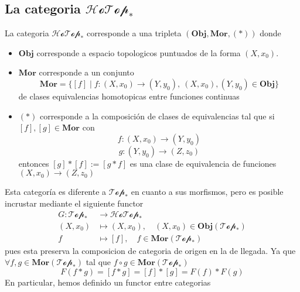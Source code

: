 \subsection{La categoria \(\mathscr{HoTop}_*\)}
\begin{definicion}
  La categoria \(\mathscr{HoTop}_*\) corresponde a una tripleta
  \((\mathbf{Obj},\mathbf {Mor}, (*))\) donde
  \begin{itemize}
  \item \(\mathbf {Obj}\) corresponde a espacio topologicos puntuados de la
    forma \((X, x_0)\).
  \item \(\mathbf {Mor}\) corresponde a un conjunto
    \[ \mathbf{Mor} = \{ [f] \mid f : (X,x_0) \to (Y,y_0),\
      (X,x_0),(Y,y_0) \in \mathbf {Obj} \}\]
    de clases equivalencias homotopicas entre funciones continuas
  \item \((*)\) corresponde a la composición de clases de
    equivalencias tal que si \([f] , [g] \in \mathbf {Mor} \) con
    \[ f : (X,x_0) \to (Y, y_0)\]
    \[ g : (Y, y_0) \to (Z, z_0)\]
    entonces \([g] * [f] := [ g * f ] \) es una clase de equivalencia de
    funciones \((X, x_0) \to (Z, z_0)\)
  \end{itemize}
\end{definicion}
Esta categoría es diferente a \(\mathscr{Top}_*\) en cuanto a sus
morfismos, pero es posible incrustar mediante el siguiente functor
\begin{align*}
  G : \mathscr{Top}_* &\longrightarrow \mathscr{HoTop}_* \\
      \left( X , x_0 \right) &\longmapsto \left( X , x_0 \right), \quad \left( X, x_0 \right) \in \mathbf {Obj} \left( \mathscr{Top}_* \right) \\
      f &\longmapsto [f], \quad f \in \mathbf {Mor} \left( \mathscr{Top}_* \right)
\end{align*}
pues esta preserva la composicion de categoria de origen en la de
llegada. Ya que \(\forall f,g \in \mathbf {Mor} (\mathscr{Top}_*)\) tal que
\(f \circ g \in \mathbf {Mor} (\mathscr{Top}_*)\)
\[ F(f * g) = [f * g] = [f] * [g] = F(f) * F(g) \]
En particular, hemos definido un functor entre categorias

